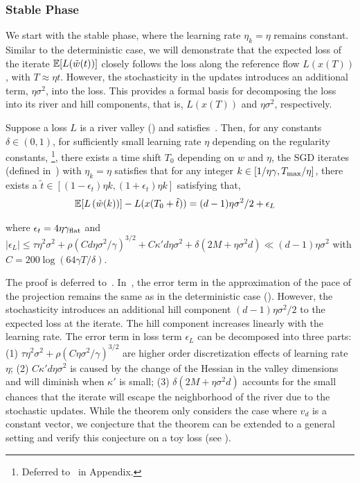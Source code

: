 \subsubsection{Stable Phase} 

We start with the stable phase, where the learning rate \(\eta_k = \eta\) remains constant. Similar to the deterministic case, we will demonstrate that the expected loss of the iterate \(\mathbb{E}[L(\tilde{w}(t))]\) closely follows the loss along the reference flow \(L(x(T))\), with \(T \approx \eta t\). However, the stochasticity in the updates introduces an additional term, \(\eta \sigma^2\), into the loss. This provides a formal basis for decomposing the loss into its river and hill components, that is, $L(x(T))$ and $\eta\sigma^2$, respectively.
 

\begin{theorem}
\label{thm:sgd-main}
Suppose a loss $L$ is a river valley () and satisfies~. Then, for any constants $\delta \in (0,1)$, for sufficiently small learning rate $\eta$ depending on the regularity constants, \footnote{Deferred to~ in Appendix.}, there exists a time shift $T_0$ depending on $w$ and $\eta$, the SGD iterates (defined in~) with $\eta_k = \eta$ satisfies that for any integer $k \in [1 /{\eta\gamma}, T_{\mathrm{max}} / \eta]$, there exists a $\tilde t \in [(1 - \epsilon_{t}) \eta k, (1 + \epsilon_t) \eta k]$ satisfying that,
\begin{align*}
\mathbb{E}[L\left( \tilde w (k)\right)] - L( x( T_0  + \tilde t))& =  {(d - 1) \eta \sigma^2}/{2} + \epsilon_{L} \end{align*}


where $\epsilon_{t} = 4 \eta \gamma_{\mathrm{flat}}$ and $|\epsilon_{L}| \le \tau \eta^2  \sigma^2+ \rho (C {d\eta \sigma^2}/{\gamma})^{3/2} + C \kappa' d \eta \sigma^2 +  \delta (2 M + \eta \sigma^2 d) \ll (d - 1) \eta \sigma^2$ with $C = 200 \log(64 \gamma T/\delta)$. 
\end{theorem}

The proof is deferred to~. In~, the error term in the approximation of the pace of the projection remains the same as in the deterministic case (). However, the stochasticity introduces an additional hill component $(d - 1)\eta \sigma^2 / 2$ to the expected loss at the iterate. The hill component increases linearly with the learning rate. The error term in loss term $\epsilon_{L}$ can be decomposed into three parts: (1) $ \tau \eta^2  \sigma^2 + \rho (C {\eta \sigma^2}/{\gamma})^{3/2}$ are higher order discretization effects of learning rate $\eta$; (2) $C \kappa' d \eta \sigma^2$ is caused by the change of the Hessian in the valley dimensions and will diminish when $\kappa'$ is small; (3)  $\delta (2M + \eta \sigma^2 d)$ accounts for the small chances that the iterate will escape the neighborhood of the river due to the stochastic updates. While the theorem only considers the case where $v_d$ is a constant vector, we conjecture that the theorem can be extended to a general setting and verify this conjecture on a toy loss (see ). 






